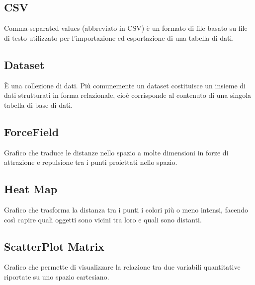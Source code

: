 \documentclass[../manuale_utente.tex]{subfiles}
\begin{document}
\subsection*{CSV}
{}
Comma-separated values (abbreviato in CSV) è un formato di file basato su file di testo utilizzato per l'importazione ed esportazione di una tabella di dati.

\subsection*{Dataset}
{}
È una collezione di dati. Più comunemente un dataset costituisce un insieme di dati strutturati in forma relazionale, cioè corrisponde al contenuto di una singola tabella di base di dati.

\subsection*{ForceField}
{}
Grafico che traduce le distanze nello spazio a molte dimensioni in forze di attrazione e repulsione tra i punti proiettati nello spazio.

\subsection*{Heat Map}
{}
Grafico che trasforma la distanza tra i punti i colori più o meno intensi, facendo così capire quali oggetti sono vicini tra loro e quali sono distanti.

\subsection*{ScatterPlot Matrix}
{}
Grafico che permette di visualizzare la relazione tra due variabili quantitative riportate su uno spazio cartesiano.
\end{document}
